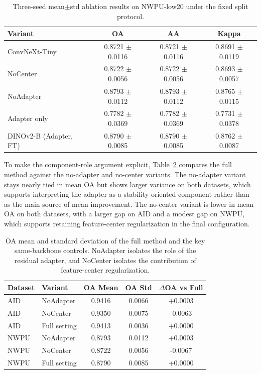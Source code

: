 \documentclass[a4paper,fleqn]{cas-sc}
\begin{document}
\begin{table}
  \centering
  \caption{Three-seed mean$\pm$std ablation results on NWPU-low20 under the fixed split protocol.}
  \label{tab:nwpu-low20_ablation}
  \begin{tabular}{l c c c}
    \toprule
    Variant & OA & AA & Kappa \\
    \midrule
    ConvNeXt-Tiny & 0.8721 $\pm$ 0.0116 & 0.8721 $\pm$ 0.0116 & 0.8691 $\pm$ 0.0119 \\
    NoCenter & 0.8722 $\pm$ 0.0056 & 0.8722 $\pm$ 0.0056 & 0.8693 $\pm$ 0.0057 \\
    NoAdapter & 0.8793 $\pm$ 0.0112 & 0.8793 $\pm$ 0.0112 & 0.8765 $\pm$ 0.0115 \\
    Adapter only & 0.7782 $\pm$ 0.0369 & 0.7782 $\pm$ 0.0369 & 0.7731 $\pm$ 0.0378 \\
    DINOv2-B (Adapter, FT) & 0.8790 $\pm$ 0.0085 & 0.8790 $\pm$ 0.0085 & 0.8762 $\pm$ 0.0087 \\
    \bottomrule
  \end{tabular}
\end{table}


To make the component-role argument explicit, Table~\ref{tab:stability_results} compares the full method against the no-adapter and no-center variants. The no-adapter variant stays nearly tied in mean OA but shows larger variance on both datasets, which supports interpreting the adapter as a stability-oriented component rather than as the main source of mean improvement. The no-center variant is lower in mean OA on both datasets, with a larger gap on AID and a modest gap on NWPU, which supports retaining feature-center regularization in the final configuration.

\begin{table}
  \centering
  \scriptsize
  \setlength{\tabcolsep}{3pt}
  \caption{OA mean and standard deviation of the full method and the key same-backbone controls. NoAdapter isolates the role of the residual adapter, and NoCenter isolates the contribution of feature-center regularization.}
  \label{tab:stability_results}
  \begin{tabular}{l >{\raggedright\arraybackslash}p{} c c c}
    \toprule
    Dataset & Variant & OA Mean & OA Std & $\Delta$OA vs Full \\
    \midrule
    AID & NoAdapter & 0.9416 & 0.0066 & +0.0003 \\
    AID & NoCenter & 0.9350 & 0.0075 & -0.0063 \\
    AID & Full setting & 0.9413 & 0.0036 & +0.0000 \\
    NWPU & NoAdapter & 0.8793 & 0.0112 & +0.0003 \\
    NWPU & NoCenter & 0.8722 & 0.0056 & -0.0067 \\
    NWPU & Full setting & 0.8790 & 0.0085 & +0.0000 \\
    \bottomrule
  \end{tabular}
\end{table}
\end{document}
